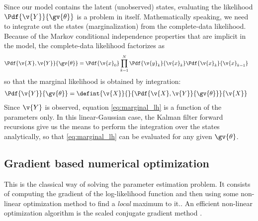Since our model contains the latent (unobserved) states, evaluating the likelihood 
$\Pdf{\v{Y}}{\gv{\theta}}$ is a problem in itself. Mathematically speaking,
we need to integrate out the states (marginalization) from 
the complete-data likelihood. Because of the
Markov conditional independence properties that are implicit in the model,
the complete-data likelihood factorizes as
\begin{align}
	\Pdf{\v{X},\v{Y}}{\gv{\theta}}&=\Pdf{\v{x}_0}\prod_{k=1}^N\Pdf{\v{y}_k}{\v{x}_{k}}\Pdf{\v{x}_k}{\v{x}_{k-1}}
	\label{eq:complete_data_lh}
\end{align}
so that the marginal likelihood is obtained by integration:
\begin{align}
	\Pdf{\v{Y}}{\gv{\theta}}&=\defint{\v{X}}{}{\Pdf{\v{X},\v{Y}}{\gv{\theta}}}{\v{X}}
	\label{eq:marginal_lh}
\end{align}
Since $\v{Y}$ is observed, equation \eqref{eq:marginal_lh} is a function of the
parameters only. In this linear-Gaussian case, the Kalman filter forward recursions give us the 
means to perform the integration over the states analytically, so that \eqref{eq:marginal_lh}
can be evaluated for any given $\gv{\theta}$.



\subsection{Gradient based numerical optimization}\label{sec:grad}

This is the classical way of solving the parameter estimation problem. It consists
of computing the gradient of the log-likelihood function and then using some
non-linear optimization method to find a \emph{local} maximum to it.\parencite{Mbalawataa}. 
An efficient non-linear optimization algorithm is the scaled 
conjugate gradient method \parencite{Mbalawataa}.

